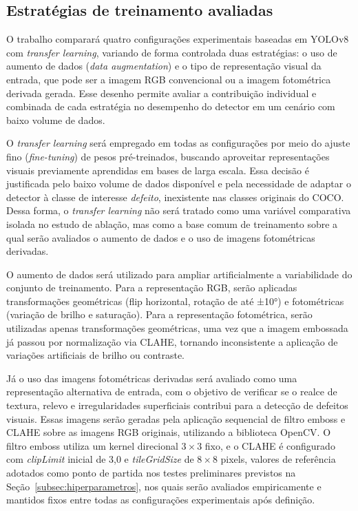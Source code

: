 \documentclass[
    12pt,                %
    openright,           %
    oneside,             %
    a4paper,             %
    english,             %
    brazil               %
]{abntex2}
\begin{document}
\subsection{Estratégias de treinamento avaliadas}
\label{subsec:estrategias}

O trabalho comparará quatro configurações experimentais baseadas
em YOLOv8 com \textit{transfer learning}, variando de forma
controlada duas estratégias: o uso de aumento de dados
(\textit{data augmentation}) e o tipo de representação visual
da entrada, que pode ser a imagem RGB convencional ou a imagem
fotométrica derivada gerada. Esse
desenho permite avaliar a contribuição individual e combinada
de cada estratégia no desempenho do detector em um cenário
com baixo volume de dados.

O \textit{transfer learning} será empregado em todas as configurações por meio 
do ajuste fino (\textit{fine-tuning}) de pesos pré-treinados, buscando aproveitar 
representações visuais previamente aprendidas em bases de larga escala. Essa 
decisão é justificada pelo baixo volume de dados disponível e pela necessidade 
de adaptar o detector à classe de interesse \textit{defeito}, inexistente nas 
classes originais do COCO. Dessa forma, o \textit{transfer learning} não será 
tratado como uma variável comparativa isolada no estudo de ablação, mas como 
a base comum de treinamento sobre a qual serão avaliados o aumento de dados 
e o uso de imagens fotométricas derivadas.

O aumento de dados será utilizado para ampliar artificialmente a variabilidade 
do conjunto de treinamento. Para a representação RGB, serão aplicadas transformações
geométricas (flip horizontal, rotação de até ±10°) e fotométricas (variação de brilho e saturação).
Para a representação fotométrica, serão utilizadas apenas transformações geométricas, uma vez que a
imagem embossada já passou por normalização via CLAHE, tornando inconsistente a aplicação de variações artificiais de brilho ou contraste.

Já o uso das imagens fotométricas derivadas será avaliado como uma 
representação alternativa de entrada, com o objetivo de verificar se 
o realce de textura, relevo e irregularidades superficiais contribui 
para a detecção de defeitos visuais. Essas imagens serão geradas pela 
aplicação sequencial de filtro emboss e CLAHE sobre as imagens RGB 
originais, utilizando a biblioteca OpenCV. O filtro emboss utiliza um 
kernel direcional $3{\times}3$ fixo, e o CLAHE é configurado com 
\textit{clipLimit} inicial de 3,0 e \textit{tileGridSize} de 
$8{\times}8$ pixels, valores de referência adotados como ponto de 
partida nos testes preliminares previstos na 
Seção~\ref{subsec:hiperparametros}, nos quais serão avaliados 
empiricamente e mantidos fixos entre todas as configurações 
experimentais após definição.
\end{document}
